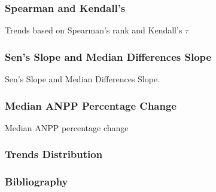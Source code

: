 \documentclass[serif, xcolor={dvipsnames}]{beamer} %
\begin{document}
\begin{frame}
\frametitle{Spearman and Kendall's}
Trends based on Spearman's rank and Kendall's $\tau$
\centering
\end{frame}
\begin{frame}
\frametitle{Sen's Slope and Median Differences Slope}
Sen's Slope and Median Differences Slope.
\begin{center}
\end{center}
\end{frame}

\begin{frame}
\frametitle{Median ANPP Percentage Change}
Median ANPP percentage change
\begin{center}
\end{center}
\end{frame}


\begin{frame}
\frametitle{Trends Distribution}
\begin{center}
\end{center}
\end{frame}

%        
%         
\begin{frame}
\frametitle{Bibliography}
\printbibliography
\end{frame}
\end{document}
